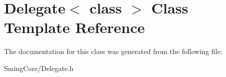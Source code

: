 \hypertarget{class_delegate}{}\section{Delegate$<$ class $>$ Class Template Reference}
\label{class_delegate}


The documentation for this class was generated from the following file\+:\begin{DoxyCompactItemize}
\item 
Sming\+Core/Delegate.\+h\end{DoxyCompactItemize}
